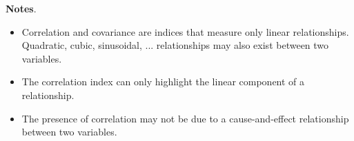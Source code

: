\begin{frame}
  \vspace*{.45cm}
  \textbf{Notes}.\\
  \begin{itemize}
    \vspace*{.45cm}
    \item Correlation and covariance are indices that measure only linear relationships. Quadratic, cubic, sinusoidal, ... relationships may also exist between two variables.
    \vspace*{.45cm}
    \item The correlation index can only highlight the linear component of a relationship.
    \vspace*{.45cm}
    \item The presence of correlation may not be due to a cause-and-effect relationship between two variables.
  \end{itemize}
\end{frame}


